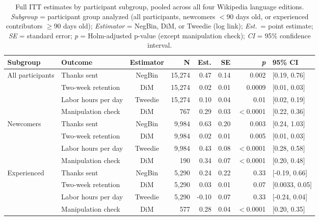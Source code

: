 \documentclass[9pt,twoside,lineno]{pnas-new}
\begin{document}
\clearpage
\begin{table}[ht]
\centering
\small
\caption{Full ITT estimates by participant subgroup, pooled across all four Wikipedia language editions. \textit{Subgroup} = participant group analyzed (all participants, newcomers $<$90 days old, or experienced contributors $\geq$90 days old); \textit{Estimator} = NegBin, DiM, or Tweedie (log link); \textit{Est.}\ = point estimate; \textit{SE} = standard error; \textit{p} = Holm-adjusted p-value (except manipulation check); \textit{CI} = 95\% confidence interval.}
\label{table:full_itt_subgroup}
\begin{tabular}{llcrrrrl}
\toprule
\textbf{Subgroup} & \textbf{Outcome} & \textbf{Estimator} & \textbf{N} & \textbf{Est.} & \textbf{SE} & \textbf{\textit{p}} & \textbf{95\% CI} \\
\midrule
All participants & Thanks sent & NegBin & 15,274 & 0.47 & 0.14 & 0.002 & [0.19, 0.76] \\
 & Two-week retention & DiM & 15,274 & 0.02 & 0.01 & 0.0009 & [0.01, 0.03] \\
 & Labor hours per day & Tweedie & 15,274 & 0.10 & 0.04 & 0.01 & [0.02, 0.19] \\
 & Manipulation check & DiM & 767 & 0.29 & 0.03 & $<$0.0001 & [0.22, 0.36] \\
\addlinespace
Newcomers & Thanks sent & NegBin & 9,984 & 0.63 & 0.20 & 0.003 & [0.24, 1.03] \\
 & Two-week retention & DiM & 9,984 & 0.02 & 0.01 & 0.005 & [0.01, 0.03] \\
 & Labor hours per day & Tweedie & 9,984 & 0.43 & 0.08 & $<$0.0001 & [0.28, 0.58] \\
 & Manipulation check & DiM & 190 & 0.34 & 0.07 & $<$0.0001 & [0.20, 0.48] \\
\addlinespace
Experienced & Thanks sent & NegBin & 5,290 & 0.24 & 0.22 & 0.33 & [-0.19, 0.66] \\
 & Two-week retention & DiM & 5,290 & 0.03 & 0.01 & 0.07 & [0.0033, 0.05] \\
 & Labor hours per day & Tweedie & 5,290 & -0.10 & 0.07 & 0.33 & [-0.24, 0.04] \\
 & Manipulation check & DiM & 577 & 0.28 & 0.04 & $<$0.0001 & [0.20, 0.35] \\
\bottomrule
\end{tabular}
\end{table}
\end{document}
